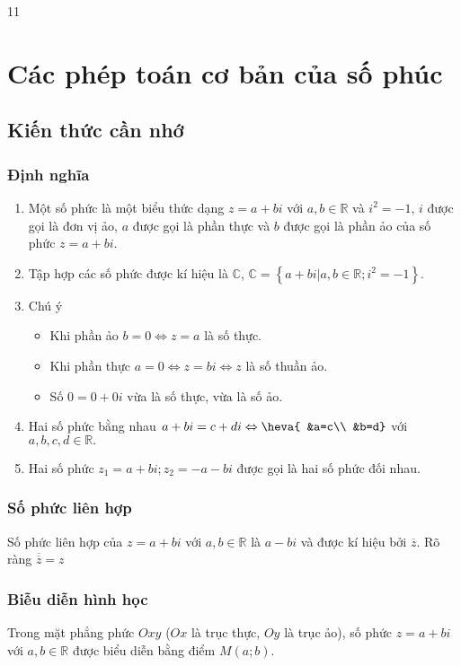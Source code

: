 \setcounter {section} {11}
\setcounter{ex}{0}
\section{Các phép toán cơ bản của số phúc}
\subsection{Kiến thức cần nhớ}
\begin{khung}
	\subsubsection{Định nghĩa}
\begin{enumerate}
	\item Một số phức là một biểu thức dạng $z=a+bi$ với  $a, b\in \mathbb{R}$ và $i^2=-1$,
	$i$  được gọi là đơn vị ảo, $a$ được gọi là phần thực và $b$ được gọi là phần ảo của số phức $z=a+bi$.
	\item Tập hợp các số phức được kí hiệu là $\mathbb{C}$,  
	$\mathbb{C}=\left\{a+bi|a, b\in \mathbb{R};i^2=-1\right\}$.
	\item Chú ý
	\begin{itemize}
		\item Khi phần ảo $b=0\Leftrightarrow z=a$ là số thực.
		\item Khi phần thực $a=0\Leftrightarrow z=bi\Leftrightarrow z$ là số thuần ảo.
		\item Số $0=0+0i$ vừa là số thực, vừa là số ảo.		
	\end{itemize}
	\item Hai số phức bằng nhau $a+bi=c+di \Leftrightarrow \heva{
		&a=c\\
		&b=d}$ với $a, b, c, d\in \mathbb{R}.$
	\item Hai số phức $z_1=a+bi; z_2=-a-bi$ được gọi là hai số phức đối nhau.
\end{enumerate}
\subsubsection{Số phức liên hợp}
Số phức liên hợp của $z=a+bi$ với $a,b\in \mathbb{R}$ là $a-bi$ và được kí hiệu bởi $\overline{z}$. Rõ ràng $\overline{\overline{z}}=z$
\subsubsection{Biễu diễn hình học}
Trong mặt phẳng phức $Oxy$ ($Ox$ là trục thực, $Oy$ là trục ảo), số phức  $z=a+bi$ với  $a, b\in \mathbb{R}$ được biểu diễn bằng điểm $M(a;b)$.

\end{khung}
